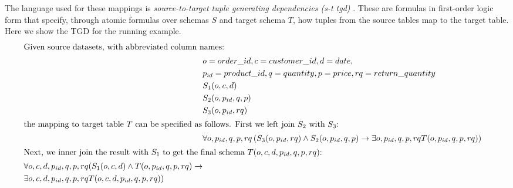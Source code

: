 The language used for these mappings is \textit{source-to-target tuple generating dependencies (s-t tgd)} \cite{tgds-Fagin2009}. These are formulas in first-order logic form that specify, through atomic formulas over schemas $S$ and target schema $T$, how tuples from the source tables map to the target table. Here we show the TGD for the running example.\begin{alignat*}{2}
    \intertext{Given source datasets, with abbreviated column names:}
     & o=order\_id, c=customer\_id, d=date,                                                                                                                      \\
     & p_{id}=product\_id, q=quantity, p=price, rq=return\_quantity                                                                                              \\
     & S_1(o, c, d)                                                                                                                                              \\
     & S_2(o, p_{id} , q,  p)                                                                                                                                    \\
     & S_3(o, p_{id}, rq)                                                                                                                                      & \\
    \intertext{the mapping to target table $T$ can be specified as follows. First we left join $S_2$ with $S_3$:}
     & \forall o, p_{id}, q, p, rq \left( S_3(o, p_{id}, rq) \land S_2(o, p_{id}, q, p) \rightarrow \exists o, p_{id}, q, p, rq T(o, p_{id}, q, p, rq) \right)   \\
    \intertext{Next, we inner join the result with $S_1$ to get the final schema $T(o, c, d, p_{id}, q, p, rq)$:} \begin{split}
                                                                                                                       & \forall o, c, d, p_{id}, q, p, rq ( S_1(o, c, d) \land T(o, p_{id}, q, p, rq) \rightarrow \\
                                                                                                                       & \exists o, c, d, p_{id}, q, p, rq T(o, c, d, p_{id}, q, p, rq) )
                                                                                                                  \end{split}
\end{alignat*}

